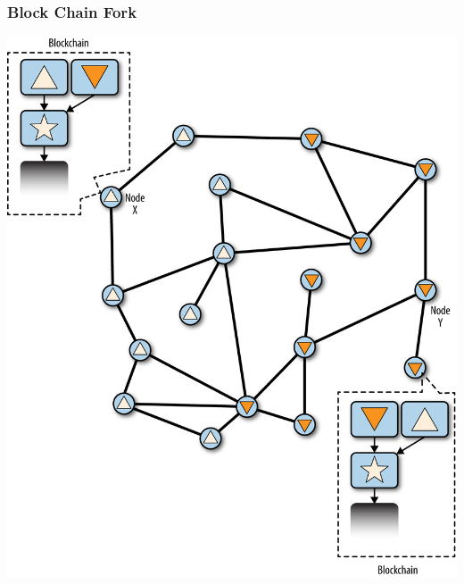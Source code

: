 \begin{frame}
    \frametitle{Block Chain Fork}
    \includegraphics[scale=0.5]{./figures/mbc2_1004.png}
\end{frame}

